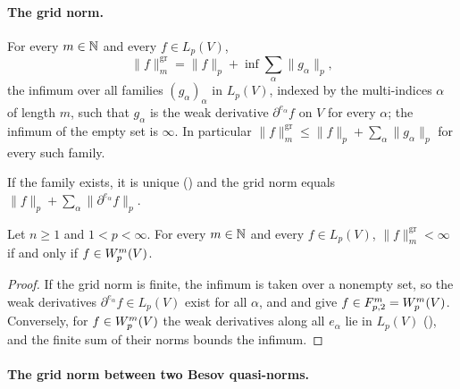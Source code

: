 \paragraph{The grid norm.}

\begin{definition}
\label{def:sobolev-grid-norm}
\leanok
{}
For every $m \in \mathbb{N}$ and every $f \in L_p(V)$,
\[
  \|f\|^{\mathrm{gr}}_{m} = \|f\|_p + \inf \sum_\alpha \|g_\alpha\|_p ,
\]
the infimum over all families $(g_\alpha)_\alpha$ in $L_p(V)$, indexed by the multi-indices
$\alpha$ of length $m$, such that $g_\alpha$ is the weak derivative $\partial^{e_\alpha} f$ on
$V$ for every $\alpha$; the infimum of the empty set is $\infty$. In particular
$\|f\|^{\mathrm{gr}}_{m} \leq \|f\|_p + \sum_\alpha \|g_\alpha\|_p$ for every such family.
\end{definition}

If the family exists, it is unique () and the grid norm equals
$\|f\|_p + \sum_\alpha \|\partial^{e_\alpha} f\|_p$.

\begin{lemma}
\label{lem:sobolev-grid-norm-finite}
\leanok
{}
Let $n \geq 1$ and $1 < p < \infty$. For every $m \in \mathbb{N}$ and every $f \in L_p(V)$,
$\|f\|^{\mathrm{gr}}_{m} < \infty$ if and only if $f \in W^{m}_{p}(V)$.
\end{lemma}

\begin{proof}
\leanok
If the grid norm is finite, the infimum is taken over a nonempty set, so the weak derivatives
$\partial^{e_\alpha} f \in L_p(V)$ exist for all $\alpha$, and
and  give $f \in F^{m}_{p,2} = W^{m}_{p}(V)$. Conversely,
for $f \in W^{m}_{p}(V)$ the weak derivatives along all $e_\alpha$ lie in $L_p(V)$
(), and the finite sum of their norms bounds the infimum.
\end{proof}

\paragraph{The grid norm between two Besov quasi-norms.}

